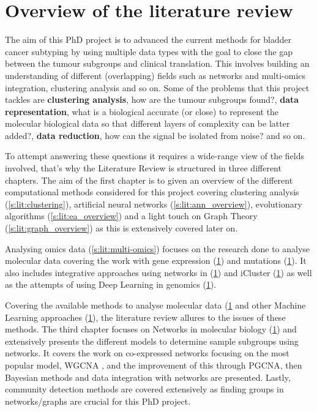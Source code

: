 

\section{Overview of the literature review}


The aim of this PhD project is to advanced the current methods for bladder cancer subtyping by using multiple data types with the goal to close the gap between the tumour subgroups and clinical translation. This involves building an understanding of different (overlapping) fields such as networks and multi-omics integration, clustering analysis and so on. Some of the problems that this project tackles are \textbf{clustering analysis}, how are the tumour subgroups found?, \textbf{data representation}, what is a biological accurate (or close) to represent the molecular biological data so that different layers of complexity can be latter added?, \textbf{data reduction}, how can the signal be isolated from noise? and so on.

To attempt answering these questions it requires a wide-range view of the fields involved, that's why the Literature Review is structured in three different chapters. The aim of the first chapter is to given an overview of the different computational methods considered for this project covering clustering analysis (\ref{s:lit:clustering}), artificial neural networks (\ref{s:lit:ann_overview}), evolutionary algorithms (\ref{s:lit:ea_overview}) and a light touch on Graph Theory (\ref{s:lit:graph_overview}) as this is extensively covered later on.

Analysing omics data (\ref{s:lit:multi-omics}) focuses on the research done to analyse molecular data covering the work with gene expression (\ref{}) and mutations (\ref{}). It also includes integrative approaches using networks in (\ref{}) and iCluster (\ref{}) as well as the attempts of using Deep Learning in genomics (\ref{}). 

Covering the available methods to analyse molecular data (\ref{} and other Machine Learning approaches (\ref{}), the literature review allures to the issues of these methods. The third chapter focuses on Networks in molecular biology (\ref{}) and extensively presents the different models to determine sample subgroups using networks. It covers the work on co-expressed networks focusing on the most popular model, WGCNA \citet{Langfelder2008-sn}, and the improvement of this through PGCNA\citet{Care2019-ij}, then Bayesian methods and data integration with networks are presented. Lastly, community detection methods are covered extensively as finding groups in networks/graphs are crucial for this PhD project.





